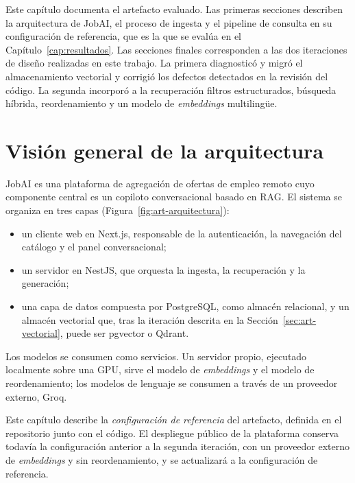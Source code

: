 Este capítulo documenta el artefacto evaluado. Las primeras secciones describen la arquitectura de JobAI, el proceso de ingesta y el pipeline de consulta en su configuración de referencia, que es la que se evalúa en el Capítulo~\ref{cap:resultados}. Las secciones finales corresponden a las dos iteraciones de diseño realizadas en este trabajo. La primera diagnosticó y migró el almacenamiento vectorial y corrigió los defectos detectados en la revisión del código. La segunda incorporó a la recuperación filtros estructurados, búsqueda híbrida, reordenamiento y un modelo de \textit{embeddings} multilingüe.

\section{Visión general de la arquitectura}
\label{sec:art-arquitectura}

JobAI es una plataforma de agregación de ofertas de empleo remoto cuyo componente central es un copiloto conversacional basado en RAG. El sistema se organiza en tres capas (Figura~\ref{fig:art-arquitectura}):
\begin{itemize}
    \item un cliente web en Next.js, responsable de la autenticación, la navegación del catálogo y el panel conversacional;
    \item un servidor en NestJS, que orquesta la ingesta, la recuperación y la generación;
    \item una capa de datos compuesta por PostgreSQL, como almacén relacional, y un almacén vectorial que, tras la iteración descrita en la Sección~\ref{sec:art-vectorial}, puede ser pgvector o Qdrant.
\end{itemize}
Los modelos se consumen como servicios. Un servidor propio, ejecutado localmente sobre una GPU, sirve el modelo de \textit{embeddings} y el modelo de reordenamiento; los modelos de lenguaje se consumen a través de un proveedor externo, Groq.

Este capítulo describe la \emph{configuración de referencia} del artefacto, definida en el repositorio junto con el código. El despliegue público de la plataforma conserva todavía la configuración anterior a la segunda iteración, con un proveedor externo de \textit{embeddings} y sin reordenamiento, y se actualizará a la configuración de referencia.

